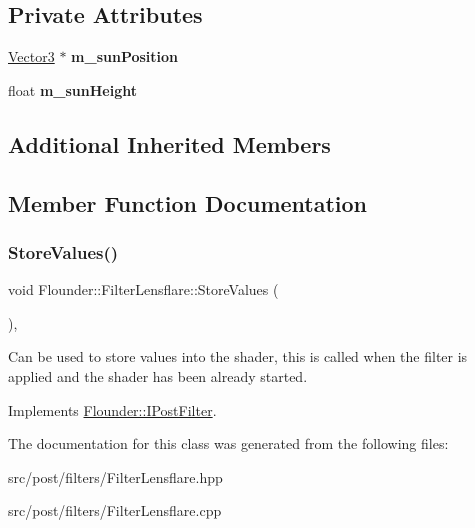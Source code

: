 \subsection*{Private Attributes}
\begin{DoxyCompactItemize}
\item 
\mbox{\label{class_flounder_1_1_filter_lensflare_a11f0f142e3ecbc8b3f58345b85cd5e6a}} 
\hyperlink{class_flounder_1_1_vector3}{Vector3} $\ast$ {\bfseries m\+\_\+sun\+Position}
\item 
\mbox{\label{class_flounder_1_1_filter_lensflare_a8c0b3c24bc79a53a7dda0f80515025b3}} 
float {\bfseries m\+\_\+sun\+Height}
\end{DoxyCompactItemize}
\subsection*{Additional Inherited Members}


\subsection{Member Function Documentation}
\mbox{\label{class_flounder_1_1_filter_lensflare_ae597fe90e24f1f2df20c0dec51ea423c}} 
\subsubsection{\texorpdfstring{Store\+Values()}{StoreValues()}}
{\footnotesize\ttfamily void Flounder\+::\+Filter\+Lensflare\+::\+Store\+Values (\begin{DoxyParamCaption}{ }\end{DoxyParamCaption})\hspace{0.3cm}{\ttfamily [override]}, {\ttfamily [virtual]}}



Can be used to store values into the shader, this is called when the filter is applied and the shader has been already started. 



Implements \hyperlink{class_flounder_1_1_i_post_filter_a20420ec0a9bac67437740552bea9ab74}{Flounder\+::\+I\+Post\+Filter}.



The documentation for this class was generated from the following files\+:\begin{DoxyCompactItemize}
\item 
src/post/filters/Filter\+Lensflare.\+hpp\item 
src/post/filters/Filter\+Lensflare.\+cpp\end{DoxyCompactItemize}
